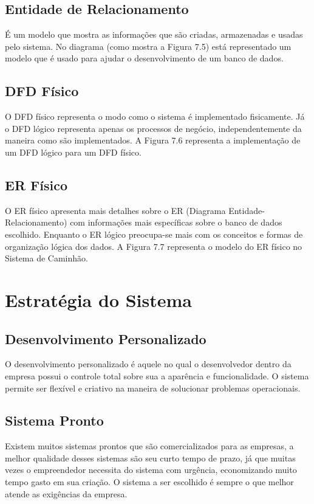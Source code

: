 \subsection{Entidade de Relacionamento}
É um modelo que mostra as informações que são criadas, armazenadas e usadas pelo sistema.
No diagrama (como mostra a Figura 7.5) está representado um modelo que é usado para ajudar o desenvolvimento de um banco de dados.

\subsection{DFD Físico}
O DFD físico representa o modo como o sistema é implementado fisicamente. Já o DFD lógico representa apenas os processos de negócio, independentemente da maneira como são implementados. A Figura 7.6 representa a implementação de um DFD lógico para um DFD físico.

\subsection{ER Físico}
O ER físico apresenta mais detalhes sobre o ER (Diagrama Entidade-Relacionamento) com informações mais específicas sobre o banco de dados escolhido. Enquanto o ER lógico preocupa-se mais com os conceitos e formas de organização lógica dos dados. A Figura 7.7 representa o modelo do ER físico no Sistema de Caminhão.

\section{Estratégia do Sistema}

\subsection{Desenvolvimento Personalizado}
 O desenvolvimento personalizado é aquele no qual o desenvolvedor dentro da empresa possui o controle total sobre sua a aparência e funcionalidade. O sistema permite ser flexível e criativo na maneira de solucionar problemas operacionais.

\subsection{Sistema Pronto}
Existem muitos sistemas prontos que são comercializados para as empresas, a melhor qualidade desses sistemas são seu curto tempo de prazo, já que muitas vezes o empreendedor necessita do sistema com urgência, economizando muito tempo gasto em sua criação. O sistema a ser escolhido é sempre o que melhor atende as exigências da empresa.

